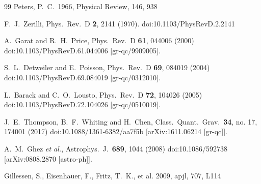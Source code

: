 \documentclass[prd, amsfonts, twocolumn, nofootinbib, showpacs]{revtex4}
\begin{document}
\begin{thebibliography}{99}
   Peters, P.~C.\ 1966, Physical Review, 146, 938

  F.~J.~Zerilli,
  Phys.\ Rev.\ D {\bf 2}, 2141 (1970).
  doi:10.1103/PhysRevD.2.2141

  A.~Garat and R.~H.~Price,
  Phys.\ Rev.\ D {\bf 61}, 044006 (2000)
  doi:10.1103/PhysRevD.61.044006
  [gr-qc/9909005].

  S.~L.~Detweiler and E.~Poisson,
  Phys.\ Rev.\ D {\bf 69}, 084019 (2004)
  doi:10.1103/PhysRevD.69.084019
  [gr-qc/0312010].


  L.~Barack and C.~O.~Lousto,
  Phys.\ Rev.\ D {\bf 72}, 104026 (2005)
  doi:10.1103/PhysRevD.72.104026
  [gr-qc/0510019].

  J.~E.~Thompson, B.~F.~Whiting and H.~Chen,
  Class.\ Quant.\ Grav.\  {\bf 34}, no. 17, 174001 (2017)
  doi:10.1088/1361-6382/aa7f5b
  [arXiv:1611.06214 [gr-qc]].

  A.~M.~Ghez {\it et al.},
  Astrophys.\ J.\  {\bf 689}, 1044 (2008)
  doi:10.1086/592738
  [arXiv:0808.2870 [astro-ph]].


 Gillessen, S., Eisenhauer, F., Fritz, T.~K., et al. 2009, apjl, 707, L114




\end{thebibliography}
\end{document}
